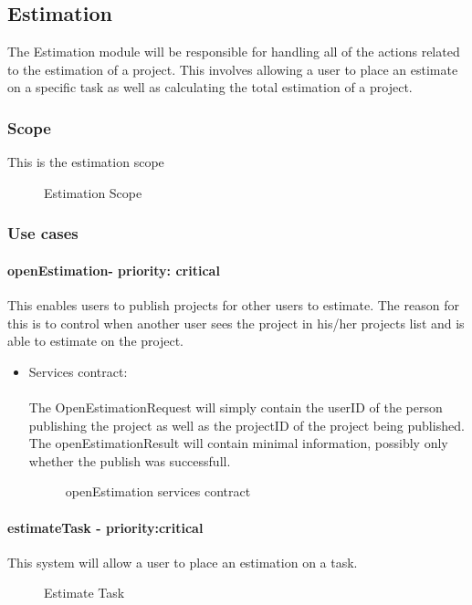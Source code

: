 \subsection{Estimation}
	The Estimation module will be responsible for handling all of the actions related to the estimation of a project. This involves allowing a user to place an estimate on a specific task as well as calculating the total estimation of a project.
\subsubsection{Scope}
	This is the estimation scope
	\begin{figure}[H]
	    	\centering
	    	\caption{Estimation Scope}
	    	\label{fig:Estimation_Scope}
   	\end{figure}
\subsubsection{Use cases}


	\paragraph{openEstimation- priority: critical}
	This enables users to publish projects for other users to estimate. The reason for this is to control when another user sees the project in his/her projects list and is able to estimate on the project.

	\begin{itemize}
		\item Services contract:\\ \\
		The OpenEstimationRequest will simply contain the userID of the person publishing the project as well as the projectID of the project being published. The openEstimationResult will contain minimal information, possibly only whether the publish was successfull.
		\begin{figure}[H]
	    	\centering
	    	\caption{openEstimation services contract}
	    	\label{fig:publishProject}
	   	\end{figure}

	\end{itemize}


	\paragraph{estimateTask - priority:critical}This system will allow a user to place an estimation on a task.
	\begin{figure}[H]
	    	\centering
	    	\caption{Estimate Task}
	    	\label{fig:Estimation_estimateTask.png}
   	\end{figure}

